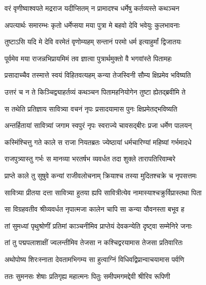 \begin{center}
\twolineshloka
{वरं वृणीष्वाश्वपते मद्रराज यदीप्सितम्}
{न प्रामादश्च धर्मेषु कर्तव्यस्ते कथञ्चन}




\twolineshloka
{अपत्यार्थः समारम्भः कृतो धर्मेप्सया मया}
{पुत्रा मे बहवो देवि भवेयुः कुलभावनाः}


\twolineshloka
{तुष्टाऽसि यदि मे देवि वरमेतं वृणोम्यहम्}
{सन्तानं परमो धर्म इत्याहुर्मां द्विजातयः}




\twolineshloka
{पूर्वमेव मया राजन्नभिप्रायमिमं तव}
{ज्ञात्वा पुत्रार्थमुक्तो वै भगवांस्ते पितामहः}


\twolineshloka
{प्रसादाच्चैव तस्मात्ते स्वयं विहितवत्यहम्}
{कन्या तेजस्विनी सौम्य क्षिप्रमेव भविष्यति}


\twolineshloka
{उत्तरं च न ते किञ्चिद्व्याहर्तव्यं कथञ्चन}
{पितामहनियोगेन तुष्टा ह्येतद्ब्रवीमि ते}


\twolineshloka
{स तथेति प्रतिज्ञाय सावित्र्या वचनं नृपः}
{प्रसादयामास पुनः क्षिप्रमेतद्भविष्यति}


\twolineshloka
{अन्तर्हितायां सावित्र्यां जगाम स्वपुरं नृपः}
{स्वराज्ये चावसद्बीरः प्रजा धर्मेण पालयन्}


\twolineshloka
{कस्मिंश्चित्तु गते काले स राजा नियतब्रतः}
{ज्येष्ठायां धर्मचारिण्यां महिष्यां गर्भमादधे}


\twolineshloka
{राजपुत्र्यास्तु गर्भः स मानव्या भरतर्षभ}
{व्यवर्धत तदा शुक्ले तारापतिरिवाम्बरे}


\twolineshloka
{प्राप्ते काले तु सुषुवे कन्यां राजीवलोचनाम्}
{क्रियाश्च तस्या मुदितश्चक्रे च नृपसत्तमः}

\twolineshloka
{सावित्र्या प्रीतया दत्ता सावित्र्या हुतया ह्यपि}
{सावित्रीत्येव नामास्याश्चक्रुर्विप्रास्तथा पिता}


\twolineshloka
{सा विग्रहवतीव श्रीव्यवर्धत नृपात्मजा}
{कालेन चापि सा कन्या यौवनस्ता बभूव ह}


\twolineshloka
{तां सुमध्यां पृथुश्रोणीं प्रतिमां काञ्चनीमिव}
{प्राप्तेयं देवकन्येति दृष्ट्वा सम्मेनिरे जनाः}


\twolineshloka
{तां तु पद्मपलाशाक्षीं ज्वलन्तीमिव तेजसा}
{न कश्चिद्वरयामास तेजसा प्रतिवारितः}


\twolineshloka
{अथोपोष्य शिरःस्नाता देवतामभिगम्य सा}
{हुत्वाग्निं विधिवद्विप्रान्वाचयामास पर्वणि}


\twolineshloka
{ततः सुमनसः शेषाः प्रतिगृह्य महात्मनः}
{पितुः समीपमगमद्देवी श्रीरिव रूपिणी}



\end{center}
